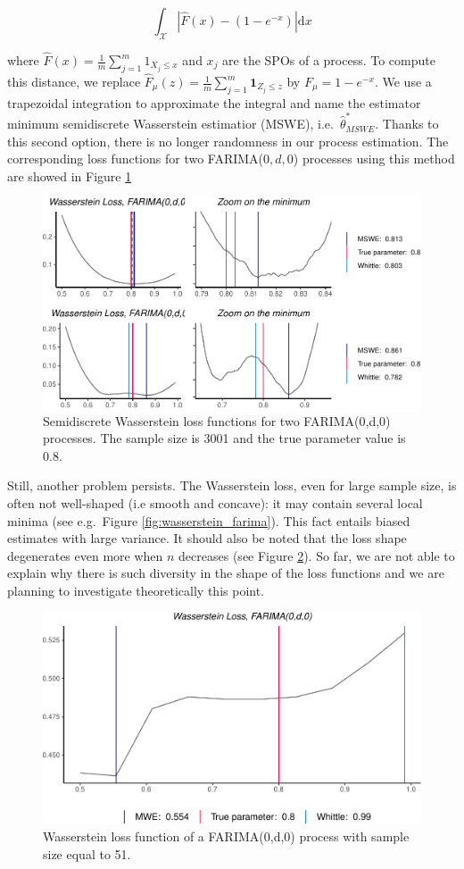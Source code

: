 \documentclass[
  11pt,
]{article}
\begin{document}
\begin{equation}
\int_\mathcal{X}\left|\hat F(x)- (1 - e^{-x})\right| \mathrm{d} x 
\end{equation}

where \(\hat F(x) = \frac{1}{m} \sum_{j=1}^{m} 1_{X_{j} \leq x}\) and
\(x_j\) are the SPOs of a process. To compute this distance, we replace
\(\hat F_\mu(z) = \frac{1}{m}\sum_{j=1}^{m} \mathbf{1}_{Z_{j} \leq z}\)
by \(F_\mu = 1 - e^{-x}\). We use a trapezoidal integration to
approximate the integral and name the estimator minimum semidiscrete
Wasserstein estimatior (MSWE), i.e.~\(\hat \theta^*_{MSWE}\). Thanks to
this second option, there is no longer randomness in our process
estimation. The corresponding loss functions for two FARIMA(\(0,d,0\))
processes using this method are showed in Figure \ref{fig:semi_wass}

\begin{figure}

{\centering \includegraphics[width=0.6\linewidth]{Master_thesis_V3_files/figure-latex/semi_wass-1} 

}

\caption{Semidiscrete Wasserstein loss functions for two FARIMA(0,d,0) processes. The sample size is 3001 and the true parameter value is 0.8.}\label{fig:semi_wass}
\end{figure}

Still, another problem persists. The Wasserstein loss, even for large
sample size, is often not well-shaped (i.e smooth and concave): it may
contain several local minima (see e.g.~Figure
\ref{fig:wasserstein_farima}). This fact entails biased estimates with
large variance. It should also be noted that the loss shape degenerates
even more when \(n\) decreases (see Figure \ref{fig:small_sample}). So
far, we are not able to explain why there is such diversity in the shape
of the loss functions and we are planning to investigate theoretically
this point.

\begin{figure}

{\centering \includegraphics[width=0.5\linewidth]{Master_thesis_V3_files/figure-latex/small_sample-1} 

}

\caption{Wasserstein loss function of a FARIMA(0,d,0) process with sample size equal to 51.}\label{fig:small_sample}
\end{figure}
\end{document}
